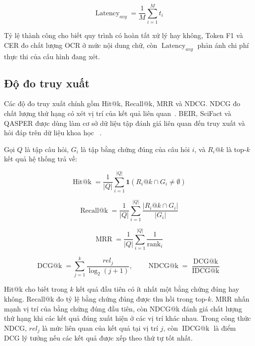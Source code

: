 \documentclass[../DoAn.tex]{subfiles}
\begin{document}
\begin{equation}
\label{eq:avg-latency}
\operatorname{Latency}_{avg} =
\frac{1}{M}
\sum_{i=1}^{M} t_i
\end{equation}

Tỷ lệ thành công cho biết quy trình có hoàn tất xử lý hay không, Token F1 và CER đo
chất lượng OCR ở mức nội dung chữ, còn \(\operatorname{Latency}_{avg}\) phản ánh
chi phí thực thi của cấu hình đang xét.

\subsection{Độ đo truy xuất}

Các độ đo truy xuất chính gồm Hit@k, Recall@k, MRR và NDCG. NDCG đo chất
lượng thứ hạng có xét vị trí của kết quả liên quan~\cite{jarvelin2002ndcg}. BEIR,
SciFact và QASPER được dùng làm cơ sở dữ liệu tập đánh giá liên quan đến truy
xuất và hỏi đáp trên dữ liệu khoa học~
\cite{thakur2021beir,wadden2020scifact,dasigi2021qasper}.

Gọi \(Q\) là tập câu hỏi, \(G_i\) là tập bằng chứng đúng của câu hỏi \(i\), và
\(R_i@k\) là top-\(k\) kết quả hệ thống trả về:

\begin{equation}
\label{eq:hit-at-k}
\operatorname{Hit@k} =
\frac{1}{|Q|}
\sum_{i=1}^{|Q|}
\mathbf{1}\left(R_i@k \cap G_i \neq \emptyset\right)
\end{equation}

\begin{equation}
\label{eq:recall-at-k}
\operatorname{Recall@k} =
\frac{1}{|Q|}
\sum_{i=1}^{|Q|}
\frac{|R_i@k \cap G_i|}{|G_i|}
\end{equation}

\begin{equation}
\label{eq:mrr}
\operatorname{MRR} =
\frac{1}{|Q|}
\sum_{i=1}^{|Q|}
\frac{1}{\operatorname{rank}_i}
\end{equation}

\begin{equation}
\label{eq:ndcg}
\operatorname{DCG@k} =
\sum_{j=1}^{k}
\frac{rel_j}{\log_2(j+1)},
\qquad
\operatorname{NDCG@k} =
\frac{\operatorname{DCG@k}}{\operatorname{IDCG@k}}
\end{equation}

Hit@k cho biết trong \(k\) kết quả đầu tiên có ít nhất một bằng chứng đúng hay
không. Recall@k đo tỷ lệ bằng chứng đúng được thu hồi trong top-\(k\). MRR nhấn
mạnh vị trí của bằng chứng đúng đầu tiên, còn NDCG@k đánh giá chất lượng thứ hạng
khi các kết quả đúng xuất hiện ở các vị trí khác nhau. Trong công thức NDCG,
\(rel_j\) là mức liên quan của kết quả tại vị trí \(j\), còn \(\operatorname{IDCG@k}\)
là điểm DCG lý tưởng nếu các kết quả được xếp theo thứ tự tốt nhất.
\end{document}
